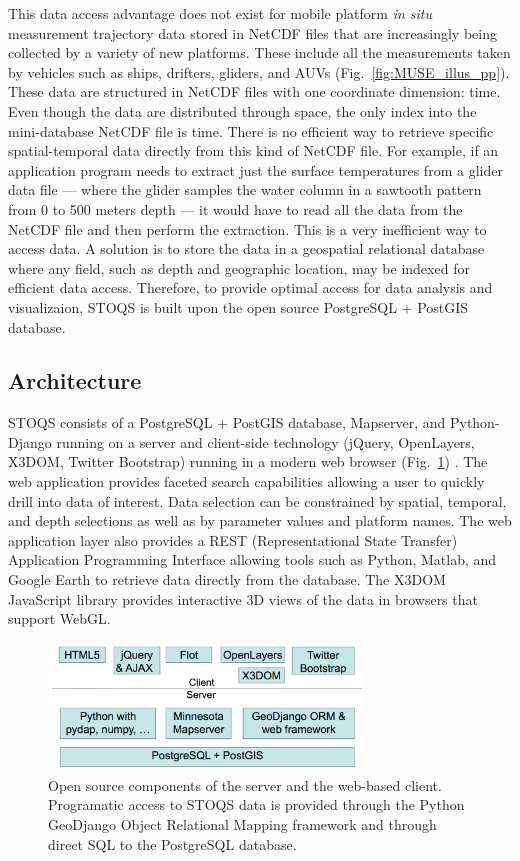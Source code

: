 \documentclass[conference]{IEEEtran}
\begin{document}
This data access advantage does not exist for mobile platform \textit{in situ} measurement trajectory data stored in NetCDF files that are increasingly being collected by a variety of new platforms. These include all the measurements taken by vehicles such as ships, drifters, gliders, and AUVs (Fig.~\ref{fig:MUSE_illus_pp}). These data are structured in NetCDF files with one coordinate dimension: time. Even though the data are distributed through space, the only index into the mini-database NetCDF file is time. There is no efficient way to retrieve specific spatial-temporal data directly from this kind of NetCDF file. For example, if an application program needs to extract just the surface temperatures from a glider data file --- where the glider samples the water column in a sawtooth pattern from 0 to 500 meters depth --- it would have to read all the data from the NetCDF file and then perform the extraction. This is a very inefficient way to access data. A solution is to store the data in a geospatial relational database where any field, such as depth and geographic location,  may be indexed for efficient data access. Therefore, to provide optimal access for data analysis and visualizaion, STOQS is built upon the open source PostgreSQL + PostGIS database.



\subsection{Architecture}

STOQS consists of a PostgreSQL + PostGIS database, Mapserver, and Python-Django running on a server and client-side technology (jQuery, OpenLayers, X3DOM, Twitter Bootstrap) running in a modern web browser (Fig.~\ref{fig:STOQSArch}) . The web application provides faceted search capabilities allowing a user to quickly drill into data of interest. Data selection can be constrained by spatial, temporal, and depth selections as well as by parameter values and platform names. The web application layer also provides a REST (Representational State Transfer) Application Programming Interface allowing tools such as Python, Matlab, and Google Earth to retrieve data directly from the database. The X3DOM JavaScript library provides interactive 3D views of the data in browsers that support WebGL.

\begin{figure}[htbp]
\centering
\includegraphics[width=3.3in]{stoqs_arch_simple.png}
\caption{Open source components of the server and the web-based client. Programatic access to STOQS data is provided through the Python GeoDjango Object Relational Mapping framework and through direct SQL to the PostgreSQL database.}
\label{fig:STOQSArch}
\end{figure}
\end{document}
